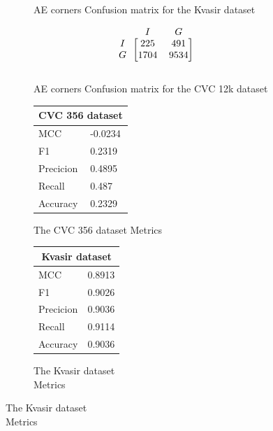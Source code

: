 \begin{figure}[h]
\begin{subfigure}[b]{0.49\textwidth}
        
\caption{AE corners Confusion matrix for the Kvasir dataset}
\label{mat:kvasir_CM_IRV2_AE_CORNER}
\end{subfigure}
\begin{subfigure}[b]{0.25\textwidth}
        \[
\begin{blockarray}{ccc}
& I & G  \\
\begin{block}{c[cc]}
 		I&225 & 491\\
        G&1704  & 9534\\
\end{block}
\end{blockarray}
\]   
\caption{AE corners Confusion matrix for the CVC 12k dataset}
\label{mat:cvc12k_CM_IRV2_AE_CORNER}
\end{subfigure}
\caption{Confusion matrices for the three datasets}
\label{mat:CM_IRV2_AE_CORNER}
\begin{subfigure}[b]{0.25\textwidth}
\begin{tabular}{ll}      
        \toprule
        \multicolumn{2}{c}{CVC 356 dataset}        \\
        \midrule
        MCC 		& -0.0234 \\
        F1  		& 0.2319 \\
        Precicion  	& 0.4895 \\
        Recall     	& 0.487 \\
        Accuracy	& 0.2329 \\
        \bottomrule
        \end{tabular}
\caption{The CVC 356 dataset Metrics}
\label{tab:cvc356_metrics_IRV2_AE_CORNER}
\end{subfigure}%
\begin{subfigure}[b]{0.49\textwidth}
    	\centering
        \begin{tabular}{ll}
        \toprule
        \multicolumn{2}{c}{Kvasir dataset}        \\
        \midrule
        MCC 		& 0.8913 \\
        F1  		& 0.9026 \\
        Precicion  	& 0.9036 \\
        Recall     	& 0.9114 \\
        Accuracy	& 0.9036 \\
        \bottomrule
\end{tabular}
\caption{The Kvasir dataset\\ Metrics}
\label{tab:kvasir_metrics_IRV2_AE_CORNER}
\end{subfigure}%

\end{figure}
